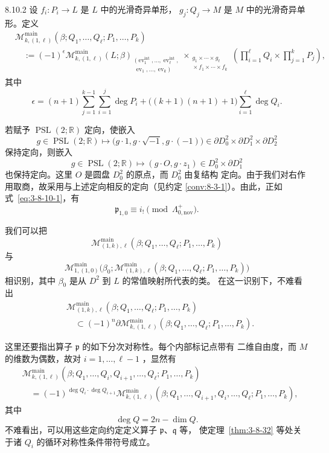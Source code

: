 \begin{definition}{8.10.2}\label{def:8-10-2}
设 $f_i\colon P_i\to L$ 是 $L$ 中的光滑奇异单形，
$g_j\colon Q_j\to M$ 是 $M$ 中的光滑奇异单形。定义
\[
\begin{aligned}
&\mathcal M_{k,(1,\ell)}^{\mathrm{main}}
(\beta;Q_1,\ldots,Q_\ell;P_1,\ldots,P_k)\\
&\quad:={}
(-1)^\epsilon
\mathcal M_{k,(1,\ell)}^{\mathrm{main}}(L;\beta)
{}_{\substack{(\operatorname{ev}_1^{\mathrm{int}},\ldots,
\operatorname{ev}_\ell^{\mathrm{int}},\\
\operatorname{ev}_1,\ldots,\operatorname{ev}_k)}}
\mathop{\times}_{\substack{g_1\times\cdots\times g_\ell\\
{}\times f_1\times\cdots\times f_k}}
\left(\prod_{i=1}^{\ell}Q_i\times\prod_{j=1}^{k}P_j\right),
\end{aligned}
\]
其中
\[
 \epsilon=(n+1)\sum_{j=1}^{k-1}\sum_{i=1}^{j}\deg P_i
 +\bigl((k+1)(n+1)+1\bigr)\sum_{i=1}^{\ell}\deg Q_i.
\]
\end{definition}

若赋予 $\operatorname{PSL}(2;\mathbb R)$ 定向，使嵌入
\[
 g\in\operatorname{PSL}(2;\mathbb R)
 \longmapsto
 \bigl(g\cdot1,g\cdot\sqrt{-1},g\cdot(-1)\bigr)
 \in\partial D_0^2\times\partial D_1^2\times\partial D_2^2
\]
保持定向，则嵌入
\[
 g\in\operatorname{PSL}(2;\mathbb R)
 \longmapsto(g\cdot O,g\cdot z_1)\in D_0^2\times\partial D_1^2
\]
也保持定向。这里 $O$ 是圆盘 $D_0^2$ 的原点，而 $D_0^2$ 由复结构
定向。由于我们对右作用取商，故采用与上述定向相反的定向（见约定
\ref{conv:8-3-1}）。由此，正如式~\eqref{eq:3-8-10-1}，有
\[
 \mathfrak p_{1,0}\equiv i_!\pmod{\Lambda_{0,\mathrm{nov}}^+}.
\]

我们可以把
\[
 \mathcal M_{(1,k),\ell}^{\mathrm{main}}
 (\beta;Q_1,\ldots,Q_\ell;P_1,\ldots,P_k)
\]
与
\[
 \mathcal M_{1,(1,0)}^{\mathrm{main}}
 \bigl(\beta_0;
 \mathcal M_{(1,k),\ell}^{\mathrm{main}}
 (\beta;Q_1,\ldots,Q_\ell;P_1,\ldots,P_k)\bigr)
\]
相识别，其中 $\beta_0$ 是从 $D^2$ 到 $L$ 的常值映射所代表的类。
在这一识别下，不难看出
\[
\begin{aligned}
&\mathcal M_{(1,k),\ell}^{\mathrm{main}}
(\beta;Q_1,\ldots,Q_\ell;P_1,\ldots,P_k)\\
&\quad\subset(-1)^n\partial
\mathcal M_{k,(1,\ell)}^{\mathrm{main}}
(\beta;Q_1,\ldots,Q_\ell;P_1,\ldots,P_k).
\end{aligned}
\]

这里还要指出算子 $\mathfrak p$ 的如下分次对称性。每个内部标记点带有
二维自由度，而 $M$ 的维数为偶数，故对 $i=1,\ldots,\ell-1$
，显然有
\[
\begin{aligned}
&\mathcal M_{k,(1,\ell)}^{\mathrm{main}}
(\beta;Q_1,\ldots,Q_i,Q_{i+1},\ldots,Q_\ell;P_1,\ldots,P_k)\\
&\quad={}
(-1)^{\deg Q_i\cdot\deg Q_{i+1}}
\mathcal M_{k,(1,\ell)}^{\mathrm{main}}
(\beta;Q_1,\ldots,Q_{i+1},Q_i,\ldots,Q_\ell;P_1,\ldots,P_k),
\end{aligned}
\]
其中
\[
 \deg Q=2n-\dim Q.
\]
不难看出，可以用这些定向约定定义算子 $\mathfrak p$、$\mathfrak q$ 等，
使定理~\ref{thm:3-8-32} 等处关于诸 $Q_i$ 的循环对称性条件带符号成立。

